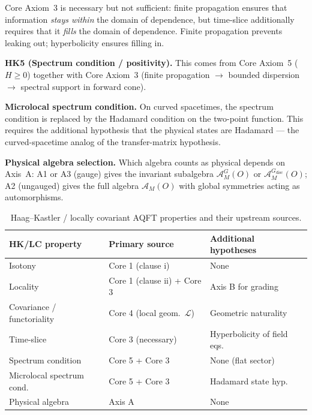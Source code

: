 \documentclass[12pt,a4paper]{article}
\theoremstyle{plain}
\theoremstyle{definition}
\theoremstyle{remark}
\newcommand{\alg}{\mathcal{A}}
\newcommand{\lag}{\mathcal{L}}
\begin{document}
Core Axiom~3 is necessary but not sufficient: finite propagation
ensures that information \emph{stays within} the domain of
dependence, but time-slice additionally requires that it \emph{fills}
the domain of dependence. Finite propagation prevents leaking out;
hyperbolicity ensures filling in.

\medskip

\noindent\textbf{HK5 (Spectrum condition / positivity).} This comes
from Core Axiom~5 ($H \ge 0$) together with Core Axiom~3 (finite
propagation $\to$ bounded dispersion $\to$ spectral support in forward
cone).

\medskip

\noindent\textbf{Microlocal spectrum condition.} On curved
spacetimes, the spectrum condition is replaced by the Hadamard
condition on the two-point function. This requires the additional
hypothesis that the physical states are Hadamard --- the
curved-spacetime analog of the transfer-matrix hypothesis.

\medskip

\noindent\textbf{Physical algebra selection.} Which algebra counts as
physical depends on Axis~A: A1 or A3 (gauge) gives the invariant
subalgebra $\alg^G_M(O)$ or $\alg^{G_{\mathrm{disc}}}_M(O)$; A2
(ungauged) gives the full algebra $\alg_M(O)$ with global symmetries
acting as automorphisms.

\begin{table}[ht]
\centering
\renewcommand{\arraystretch}{1.2}
\begin{tabular}{@{}lll@{}}
\toprule
HK/LC property & Primary source & Additional hypotheses \\
\midrule
Isotony & Core 1 (clause i) & None \\
Locality & Core 1 (clause ii) + Core 3 & Axis B for grading \\
Covariance / functoriality & Core 4 (local geom.\ $\lag$) &
Geometric naturality \\
Time-slice & Core 3 (necessary) & Hyperbolicity of field eqs.\ \\
Spectrum condition & Core 5 + Core 3 & None (flat sector) \\
Microlocal spectrum cond. & Core 5 + Core 3 & Hadamard state hyp. \\
Physical algebra & Axis A & None \\
\bottomrule
\end{tabular}
\caption{Haag--Kastler / locally covariant AQFT properties and their
  upstream sources.}
\label{tab:hk}
\end{table}
\end{document}
